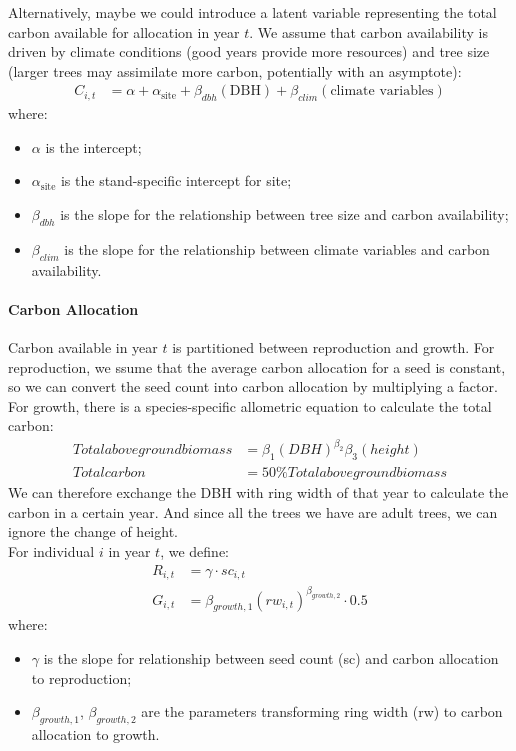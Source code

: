 \documentclass[11pt]{article}
\begin{document}
Alternatively, maybe we could introduce a latent variable representing the total carbon available for allocation in year $t$. We assume that carbon availability is driven by climate conditions (good years provide more resources) and tree size (larger trees may assimilate more carbon, potentially with an asymptote):
\begin{align}
C_{i,t} &=\alpha + \alpha_{\text{site}} +\beta_{dbh} (\text{DBH}) + \beta_{clim} (\text{climate variables})
\end{align}
where:
\begin{itemize}
    \item $\alpha$ is the intercept;
    \item $\alpha_{\text{site}}$ is the stand-specific intercept for site;
    \item $\beta_{dbh}$ is the slope for the relationship between tree size and carbon availability;
    \item $\beta_{clim}$ is the slope for the relationship between climate variables and carbon availability.
\end{itemize}

\paragraph{Carbon Allocation}

Carbon available in year $t$ is partitioned between reproduction and growth. For reproduction, we ssume that the average carbon allocation for a seed is constant, so we can convert the seed count into carbon allocation by multiplying a factor. For growth, there is a species-specific allometric equation to calculate the total carbon:
\begin{align}
Total aboveground biomass &= \beta_1(DBH)^{\beta_{2}} \beta_3(height)\\
Total carbon &= 50\%Total aboveground biomass
\end{align}
We can therefore exchange the DBH with ring width of that year to calculate the carbon in a certain year. And since all the trees we have are adult trees, we can ignore the change of height.\\

For individual $i$ in year $t$, we define:
\begin{align}
R_{i,t} &= \gamma \cdot sc_{i,t} \\
G_{i,t} &= \beta_{growth,1} (rw_{i,t})^{\beta_{growth,2}} \cdot 0.5
\end{align}
where:
\begin{itemize}
    \item  $\gamma$ is the slope for relationship between seed count (sc) and carbon allocation to reproduction;
    \item $\beta_{growth,1}$, $\beta_{growth,2}$ are the parameters transforming ring width (rw) to carbon allocation to growth.
\end{itemize}
\end{document}
